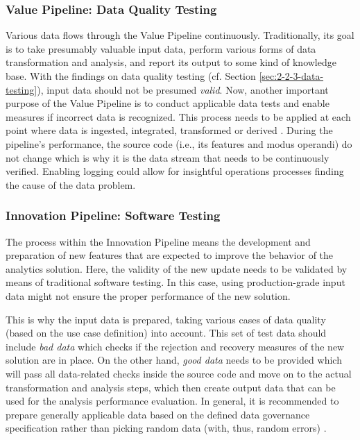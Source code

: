 \subsubsection{Value Pipeline: Data Quality Testing}
Various data flows through the Value Pipeline continuously. Traditionally, its goal is to take presumably valuable input data, perform various forms of data transformation and analysis, and report its output to some kind of knowledge base. With the findings on data quality testing (cf. Section \ref{sec:2-2-3-data-testing}), input data should not be presumed \textit{valid}. Now, another important purpose of the Value Pipeline is to conduct applicable data tests and enable measures if incorrect data is recognized. This process needs to be applied at each point where data is ingested, integrated, transformed or derived \cite{Layton2019}\cite{DataKitchen2020}. During the pipeline's performance, the source code (i.e., its features and modus operandi) do not change which is why it is the data stream that needs to be continuously verified. Enabling logging could allow for insightful operations processes finding the cause of the data problem.

\subsubsection{Innovation Pipeline: Software Testing}
The process within the Innovation Pipeline means the development and preparation of new features that are expected to improve the behavior of the analytics solution. Here, the validity of the new update needs to be validated by means of traditional software testing. In this case, using production-grade input data might not ensure the proper performance of the new solution. 

This is why the input data is prepared, taking various cases of data quality (based on the use case definition) into account. This set of test data should include \textit{bad data} which checks if the rejection and recovery measures of the new solution are in place. On the other hand, \textit{good data} needs to be provided \cite[234\psq]{Held2012} which will pass all data-related checks inside the source code and move on to the actual transformation and analysis steps, which then create output data that can be used for the analysis performance evaluation. In general, it is recommended to prepare generally applicable data based on the defined data governance specification rather than picking random data (with, thus, random errors) \cite[115]{Sneed2013}.

